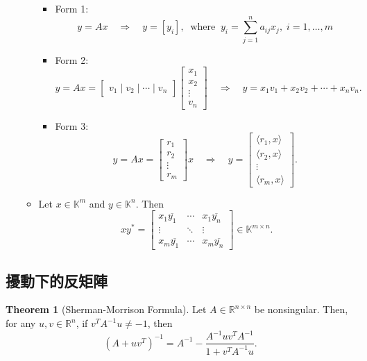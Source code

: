 \documentclass{article}
\theoremstyle{definition}
\newtheorem{theorem}{Theorem}[section]
\numberwithin{theorem}{section}
\numberwithin{equation}{section}
\begin{document}
\begin{enumerate}
\begin{itemize}
    \begin{itemize}
    \item Form 1:
      \[
        y= Ax \quad \Longrightarrow \quad y= [y_i],\;\; \text{where}\;\; y_i = \sum\limits_{j=1}^{n} a_{ij} x_j, \; i = 1, \ldots, m
        \]
    \item Form 2:
      \[
        y= Ax = \begin{bmatrix} v_1 \mid v_2 \mid \cdots \mid v_n \end{bmatrix} \begin{bmatrix} x_1 \\ x_2 \\ \vdots \\ v_n \end{bmatrix}
         \quad \Longrightarrow \quad y= x_1 v_1+x_2 v_2+\cdots+x_n v_n.
        \]
    \item Form 3:
      \[
        y= Ax = \begin{bmatrix} r_1\\ r_2\\ \vdots \\ r_m\end{bmatrix} x
         \quad \Longrightarrow \quad y= \begin{bmatrix} \langle r_1, x \rangle\\ \langle r_2, x \rangle\\ \vdots \\ \langle r_m, x \rangle\end{bmatrix}.
        \]
    \end{itemize}
  \item    Let $x \in \mathbb{K}^{m}$ and $y \in \mathbb{K}^{n}$. Then
    \[
      xy^* = \begin{bmatrix}
      x_1 \overline{y_1} & \cdots & x_1 \overline{y_n} \\
      \vdots & \ddots & \vdots \\
      x_m \overline{y_1} & \cdots & x_m \overline{y_n}
      \end{bmatrix}
      \in \mathbb{K}^{m \times n}.
      \]
  \end{itemize}
\end{enumerate}


\subsection{擾動下的反矩陣}

\begin{theorem}[Sherman-Morrison Formula]
Let $A \in \mathbb{R}^{n \times n}$ be nonsingular. Then, for any $u, v \in \mathbb{R}^n$, if $v^T A^{-1} u \neq -1$, then
\[
(A + uv^T)^{-1} = A^{-1} - \frac{A^{-1} u v^T A^{-1}}{1 + v^T A^{-1} u}.
\]
\end{theorem}
\end{document}
